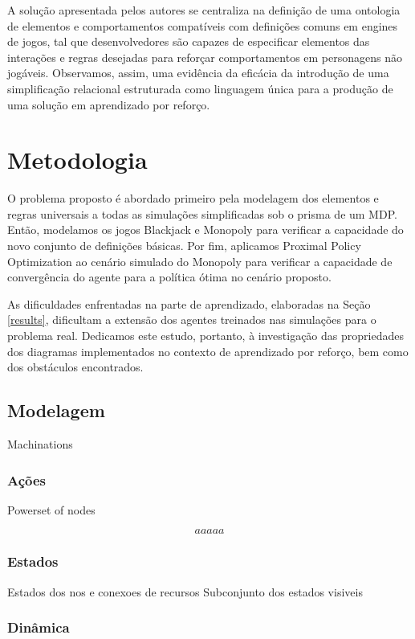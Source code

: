 \documentclass[conference]{IEEEtran}
\begin{document}
A solução apresentada pelos autores se centraliza na definição de uma ontologia de elementos e comportamentos compatíveis com definições comuns em engines de jogos, tal que desenvolvedores são capazes de especificar elementos das interações e regras desejadas para reforçar comportamentos em personagens não jogáveis. Observamos, assim, uma evidência da eficácia da introdução de uma simplificação relacional estruturada como linguagem única para a produção de uma solução em aprendizado por reforço.

\section{Metodologia}

O problema proposto é abordado primeiro pela modelagem dos elementos e regras universais a todas as simulações simplificadas sob o prisma de um MDP. Então, modelamos os jogos Blackjack e Monopoly para verificar a capacidade do novo conjunto de definições básicas. Por fim, aplicamos Proximal Policy Optimization ao cenário simulado do Monopoly para verificar a capacidade de convergência do agente para a política ótima no cenário proposto.

As dificuldades enfrentadas na parte de aprendizado, elaboradas na Seção \ref{results}, dificultam a extensão dos agentes treinados nas simulações para o problema real. Dedicamos este estudo, portanto, à investigação das propriedades dos diagramas implementados no contexto de aprendizado por reforço, bem como dos obstáculos encontrados.

\subsection{Modelagem}
\label{modeling}
Machinations

\subsubsection{Ações}

Powerset of nodes

$$
aaaaa
$$

\subsubsection{Estados}

Estados dos nos e conexoes de recursos
Subconjunto dos estados visiveis

\subsubsection{Dinâmica}
\end{document}
